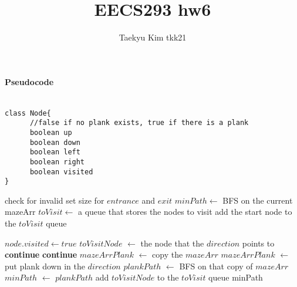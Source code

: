 \documentclass{article}
\title{EECS293 hw6}
\author{Taekyu Kim tkk21}
\begin{document}
\paragraph{Pseudocode}
\begin{verbatim}

class Node{
      //false if no plank exists, true if there is a plank
      boolean up
      boolean down
      boolean left
      boolean right
      boolean visited
}
\end{verbatim}

\begin{algorithmic}
 

\State check for invalid set size for $entrance$ and $exit$ 
\State $minPath \gets$ BFS on the current mazeArr 
\State $toVisit \gets$ a queue that stores the nodes to visit
\State add the start node to the $toVisit$ queue

\State $node.visited \gets true$
\State $toVisitNode$ $\gets$ the node that the $direction$ points to
\State \textbf{continue}
\EndIf
{}
\State \textbf{continue}
\EndIf
{}
\State $mazeArrPlank$ $\gets$ copy the $mazeArr$
\State $mazeArrPlank$ $\gets$ put plank down in the $direction$
\State $plankPath$ $\gets$ BFS on that copy of $mazeArr$
 
\State $minPath$ $\gets$ $plankPath$
\EndIf
\Else
\State add $toVisitNode$ to the $toVisit$ queue
\EndIf
\EndFor
\EndWhile
\Return minPath
\EndFunction

\end{algorithmic}
\end{document}

